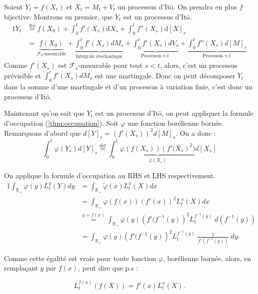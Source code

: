 \documentclass[openany]{book}
\makeatletter
\newcommand{\F}{\mathscr{F}}
\newcommand{\R}{\mathbb{R}}
\newcommand{\1}{\mathbbm{1}}
\renewcommand{\d}{\mathrm{d}}
\renewenvironment{proof}[1][\textbf{\textit{Démonstration}}]{%
  \par\pushQED{\qed}%
  \normalfont\topsep6\p@\@plus6\p@\relax
  \trivlist\item[\hskip\labelsep
    #1\@addpunct{.}]\ignorespaces
}{%
  \popQED\endtrivlist\@endpefalse
}
\theoremstyle{thmfont}
\theoremstyle{deffont}
\theoremstyle{thmfont}
\theoremstyle{deffont}
\makeatother
\begin{document}
\begin{proof}
  Soient $Y_t = f(X_t)$ et $X_t = M_t + V_t$ un processus d'Itō. On prendra en plus $f$ bijective. Montrons en premier, que $Y_t$ est un processus d'Itō. 
  \begin{alignat*}{1}
    Y_t &\overset{\text{Itō}}{=} f(X_0) + \int_0^t f'(X_s) \d X_s + \int_0^t f''(X_s) \d [X]_s\\
        &= \underbrace{f(X_0)}_{\F_0\text{-mesurable}} + \underbrace{\int_0^t f'(X_s) dM_s}_{\text{Intégrale stochastique}} + \underbrace{\int_0^t f'(X_s) dV_s}_{\text{Processus v.f.}} + \underbrace{\int_0^t f''(X_s) d[M]_s}_{\text{Processus v.f.}}
  \end{alignat*}
  Comme $f'(X_s)$ est $\F_s$-mesurable pour tout $s<t$, alors, c'est un processus prévisible et $\int_0^t f'(X_s) dM_s$ est une martingale.
  Donc on peut décomposer $Y_t$ dans la somme d'une martingale et d'un processus à variation finie, c'est donc un processus d'Itō.


  
Maintenant qu'on sait que $Y_t$ est un processus d'Itō, on peut appliquer la formule d'occupation (\autoref{thm:occupation}). Soit $\varphi$ une fonction borélienne bornée. Remarquons d'abord que $d[Y]_s = \left(f'(X_s)\right)^2 d[M]_s$. On a donc :
$$  \int_0^t \varphi(Y_s) d[Y]_s \overset{\text{def}}{=} \int_0^t \underbrace{\varphi(f(X_s)) \left(f'(X_s\right)^2)}_{\tilde\varphi(X_s)} d[X_s]
$$

On applique la formule d'occupation au RHS et LHS respectivement.
\begin{alignat*}{1}
\int_{\R_+} \varphi(y) L_t^y(Y) dy &= \int_{\R_+} \tilde\varphi(x) L_t^x(X) dx\\
                         &= \int_{\R_+}\varphi(f(x)) \left(f'(x)\right)^2 L_t^x(X) dx\\
                       &\overset{y = f(x)}{=} \int_{\R_+}\varphi(y) \left(f'(f^{-1}(y)\right)^2 L_t^{f^{-1}(y)}\;d\left(f^{-1}(y)\right) \\
  &=  \int_{\R_+}\varphi(y) \left(f' (f^{-1}(y)\right)^2 L_t^{f^{-1}(y)} \;\frac{1}{f'\left(f^{-1}(y)\right)} \;dy.
\end{alignat*}

Comme cette égalité est vraie pour toute fonction $\varphi$, borélienne bornée, alors, en remplaçant $y$ par $f(x)$, peut dire que p.s :

$$L_t^{f(x)}(f(X)) =  f'(x) L_t^{x}(X).$$
\end{proof}
\end{document}
